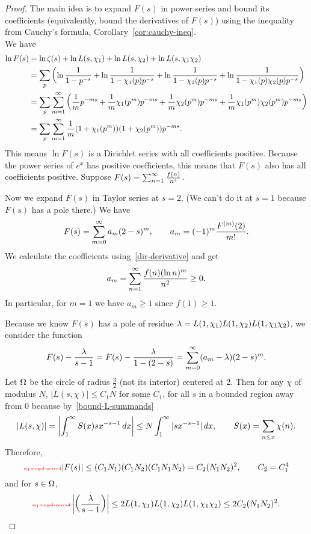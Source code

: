 \begin{proof}
The main idea is to expand $F(s)$ in power series and bound its coefficients (equivalently, bound the derivatives of $F(s)$) using the inequality from Cauchy's formula, Corollary~\ref{cor:cauchy-ineq}.\\

We have
\begin{align*}
\ln F(s)&=\ln \zeta(s)+\ln L(s,\chi_1)+\ln L(s,\chi_2)+\ln L(s,\chi_1\chi_2)\\
&=\sum_{p} \left( {\ln \frac{1}{1-p^{-s}}+\ln \frac{1}{1-\chi_1(p)p^{-s}}+\ln \frac{1}{1-\chi_2(p)p^{-s}}+\ln \frac{1}{1-\chi_1(p)\chi_2(p)p^{-s}}} \right)\\
&=\sum_p\sum_{m=1}^{\infty} \left( {\frac{1}{m}p^{-ms}+ \frac{1}{m}\chi_1(p^m)p^{-ms}+\frac{1}{m}\chi_2(p^m)p^{-ms}
+\frac{1}{m}\chi_1(p^m)\chi_2(p^m)p^{-ms}} \right)\\
&=\sum_p\sum_{m=1}^{\infty}\frac{1}{m}(1+\chi_1(p^m))(1+\chi_2(p^m))p^{-ms}.
\end{align*}
This means $\ln F(s)$ is a Dirichlet series with all coefficients positive. Because the power series of $e^x$ has positive coefficients, this means that $F(s)$ also has all coefficients positive.  Suppose $F(s)=\sum_{n=1}^{\infty}\frac{f(n)}{n^s}$.

Now we expand $F(s)$ in Taylor series at $s=2$. (We can't do it at $s=1$ because $F(s)$ has a pole there.) We have
\[
F(s)=\sum_{m=0}^{\infty} a_m(2-s)^m,\qquad a_m=(-1)^m\frac{F^{(m)}(2)}{m!}.
\]
We calculate the coefficients using~\ref{dir-derivative} and get
\[
a_m=\sum_{n=1}^{\infty}\frac{f(n)(\ln n)^m}{n^2}\ge 0.
\]
In particular, for $m=1$ we have $a_m\ge 1$ since $f(1)\ge 1$. 

Because we know $F(s)$ has a pole of residue $\lambda=L(1,\chi_1)L(1,\chi_2)L(1,\chi_1\chi_2)$, we consider the function
\[
F(s)-\frac{\lambda}{s-1}=F(s)-\frac{\lambda}{1-(2-s)}=\sum_{m=0}^{\infty}(a_m-\lambda)(2-s)^m.
\]
Let $\Omega$ be the circle of radius $\frac{3}{2}$ (not its interior) 
centered at 2. Then for any $\chi$ of modulus $N$, $|L(s,\chi)|\le C_1N$  for some $C_1$, for all $s$ in a bounded region away from 0 because by~\eqref{bound-L-summands}
\[
|L(s,\chi)|=\left| {\int_1^{\infty}S(x)sx^{-s-1}\,dx} \right|\le 
N\int_1^{\infty}|sx^{-s-1}|\,dx,\qquad S(x)=\sum_{n\le x}\chi(n).
\]
Therefore,
\begin{equation}
\llabel{eq:siegel-zero-4}
|F(s)|\le (C_1N_1)(C_1N_2)(C_1N_1N_2)=C_2(N_1N_2)^2,\qquad C_2=C_1^4
\end{equation}
and for $s\in \Omega$,
\begin{equation}
\llabel{eq:siegel-zero-4}
\ab{\pf{\la}{s-1}}\le 2L(1,\chi_1)L(1,\chi_2)L(1,\chi_1\chi_2)\le 2C_2(N_1N_2)^2.
\end{equation}


\end{proof}
